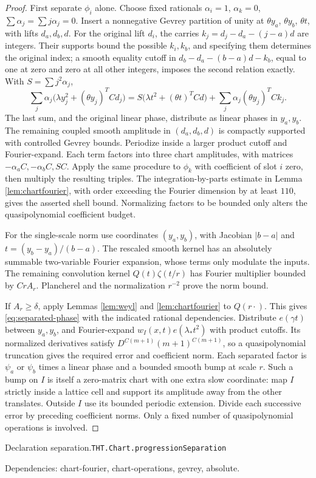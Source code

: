 \documentclass[11pt]{article}
\theoremstyle{definition}
\numberwithin{equation}{section}
\newcommand{\bp}[3]{\par\smallskip\begingroup\footnotesize
\noindent\hypertarget{bp:#1}{\textsf{Declaration #1.}}\quad\nolinkurl{#2}\par
\noindent\textsf{Dependencies:} #3.\par\endgroup\smallskip}
\begin{document}
\begin{proof}
First separate $\phi_i$ alone. Choose fixed rationals $\alpha_i=1$, $\alpha_k=0$, $\sum\alpha_j=\sum j\alpha_j=0$. Insert a nonnegative Gevrey partition of unity at $\theta y_a$, $\theta y_b$, $\theta t$, with lifts $d_a,d_b,d$. For the original lift $d_i$, the carries $k_j=d_j-d_a-(j-a)d$ are integers. Their supports bound the possible $k_i,k_b$, and specifying them determines the original index; a smooth equality cutoff in $d_b-d_a-(b-a)d-k_b$, equal to one at zero and zero at all other integers, imposes the second relation exactly. With $S=\sum j^2\alpha_j$,
\[
 \sum_j\alpha_j\bigl(\lambda y_j^2+(\theta y_j)^TCd_j\bigr)
 =S\bigl(\lambda t^2+(\theta t)^TCd\bigr)+\sum_j\alpha_j(\theta y_j)^TCk_j.
\]
The last sum, and the original linear phase, distribute as linear phases in $y_a,y_b$. The remaining coupled smooth amplitude in $(d_a,d_b,d)$ is compactly supported with controlled Gevrey bounds. Periodize inside a larger product cutoff and Fourier-expand. Each term factors into three chart amplitudes, with matrices $-\alpha_aC,-\alpha_bC,SC$. Apply the same procedure to $\phi_k$ with coefficient of slot $i$ zero, then multiply the resulting triples. The integration-by-parts estimate in Lemma \ref{lem:chartfourier}, with order exceeding the Fourier dimension by at least $110$, gives the asserted shell bound. Normalizing factors to be bounded only alters the quasipolynomial coefficient budget.

For the single-scale norm use coordinates $(y_a,y_b)$, with Jacobian $|b-a|$ and $t=(y_b-y_a)/(b-a)$. The rescaled smooth kernel has an absolutely summable two-variable Fourier expansion, whose terms only modulate the inputs. The remaining convolution kernel $Q(t)\zeta(t/r)$ has Fourier multiplier bounded by $CrA_r$. Plancherel and the normalization $r^{-2}$ prove the norm bound.

If $A_r\ge\delta$, apply Lemmas \ref{lem:weyl} and \ref{lem:chartfourier} to $Q(r\cdot)$. This gives \eqref{eq:separated-phase} with the indicated rational dependencies. Distribute $e(\gamma t)$ between $y_a,y_b$, and Fourier-expand $w_I(x,t)e(\lambda_*t^2)$ with product cutoffs. Its normalized derivatives satisfy $D^{C(m+1)}(m+1)^{C(m+1)}$, so a quasipolynomial truncation gives the required error and coefficient norm. Each separated factor is $\psi_a$ or $\psi_b$ times a linear phase and a bounded smooth bump at scale $r$. Such a bump on $I$ is itself a zero-matrix chart with one extra slow coordinate: map $I$ strictly inside a lattice cell and support its amplitude away from the other translates. Outside $I$ use its bounded periodic extension. Divide each successive error by preceding coefficient norms. Only a fixed number of quasipolynomial operations is involved.
\end{proof}
\bp{separation}{THT.Chart.progressionSeparation}{chart-fourier, chart-operations, gevrey, absolute}
\end{document}
